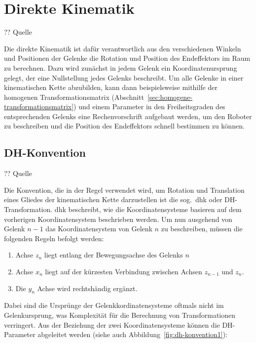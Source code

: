 \cleardoublepage


\chapter{Direkte Kinematik}\label{ch:direkte-kinematik}

?? Quelle

Die direkte Kinematik ist dafür verantwortlich aus den verschiedenen Winkeln und Positionen der Gelenke die Rotation und Position des Endeffektors im Raum zu berechnen.
Dazu wird zunächst in jedem Gelenk ein Koordinatenursprung gelegt, der eine Nullstellung jedes Gelenks beschreibt.
Um alle Gelenke in einer kinematischen Kette abzubilden, kann dann beispielsweise mithilfe der homogenen Transformationsmatrix (Abschnitt~\ref{sec:homogene-transformationsmatrix}) und einem Parameter in den Freiheitsgraden des entsprechenden Gelenks eine Rechenvorschrift aufgebaut werden, um den Roboter zu beschreiben und die Position des Endeffektors schnell bestimmen zu können.


\section{DH-Konvention}\label{sec:dh-konvention}

?? Quelle

Die Konvention, die in der Regel verwendet wird, um Rotation und Translation eines Gliedes der kinematischen Kette darzustellen ist die sog.\ \ac{dhk} oder DH-Transformation.
\ac{dhk} beschreibt, wie die Koordinatensysteme basieren auf dem vorherigen Koordinatensystem beschrieben werden.
Um nun ausgehend von Gelenk $n-1$ das Koordinatensystem von Gelenk $n$ zu beschreiben, müssen die folgenden Regeln befolgt werden:

\begin{enumerate}
    \item Achse $z_{n}$ liegt entlang der Bewegungsachse des Gelenks $n$
    \item Achse $x_{n}$ liegt auf der kürzesten Verbindung zwischen Achsen $z_{n-1}$ und $z_{n}$.
    \item Die $y_{n}$ Achse wird rechtshändig ergänzt.
\end{enumerate}

Dabei sind die Ursprünge der Gelenkkordinatensysteme oftmals nicht im Gelenkursprung, was Komplexität für die Berechnung von Transformationen verringert.
Aus der Beziehung der zwei Koordinatensysteme können die DH-Parameter abgeleitet werden (siehe auch Abbildung~\ref{fig:dh-konvention1}):

